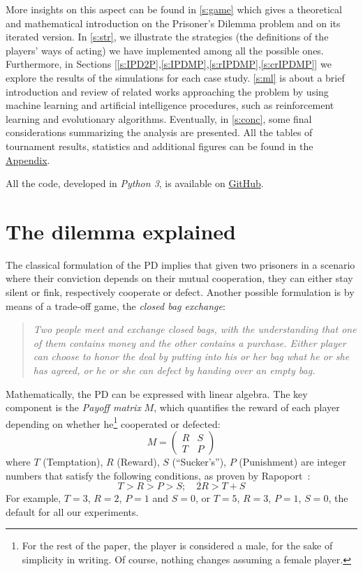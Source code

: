 \documentclass[journal,10pt,twoside]{IEEEtran}
\begin{document}
More insights on this aspect can be found in \autoref{s:game} which gives a theoretical and mathematical introduction on the Prisoner's Dilemma problem and on its iterated version.
In \autoref{s:str}, we illustrate the strategies (the definitions of the players' ways of acting) we have implemented among all the possible ones.
Furthermore, in Sections [\ref{s:IPD2P},\ref{s:IPDMP},\ref{s:rIPDMP},\ref{s:crIPDMP}] we explore the results of the simulations for each case study.
\autoref{s:ml} is about a brief introduction and review of related works approaching the problem by using machine learning and artificial intelligence procedures, such as reinforcement learning and evolutionary algorithms.
Eventually, in \autoref{s:conc}, some final considerations summarizing the analysis are presented.
All the tables of tournament results, statistics and additional figures can be found in the \hyperref[s:appendix]{Appendix}.

All the code, developed in \textit{Python 3}, is available on \href{https://github.com/eliabntt/LaboratoryOfComputationalPhysics/tree/Group9}{GitHub}.

\section{The dilemma explained} \label{s:game}
The classical formulation of the PD implies that given two prisoners in a scenario where their conviction depends on their mutual cooperation, they can either stay silent or fink, respectively cooperate or defect.
Another possible formulation is by means of a trade-off game, the \textit{closed bag exchange}:

\begin{quote}
\textit{Two people meet and exchange closed bags, with the understanding that one of them contains money and the other contains a purchase. Either player can choose to honor the deal by putting into his or her bag what he or she has agreed, or he or she can defect by handing over an empty bag.}
\end{quote}

Mathematically, the PD can be expressed with linear algebra. The key component is the \textit{Payoff matrix} $M$, which quantifies the reward of each player depending on whether he\footnote{For the rest of the paper, the player is considered a male, for the sake of simplicity in writing. Of course, nothing changes assuming a female player.} cooperated or defected:
$$
M = 
\begin{pmatrix} 
R & S \\
T & P 
\end{pmatrix}
$$
where $T$ (Temptation), $R$ (Reward), $S$ (``Sucker's''), $P$ (Punishment) are integer numbers that satisfy the following conditions, as proven by Rapoport~\cite{rapoport}:
$$
T>R>P>S; \quad 2R > T+S 
$$
For example, $T=3$, $R=2$, $P=1$ and $S=0$, or  $T=5$, $R=3$, $P=1$, $S=0$, the default for all our experiments.
\end{document}
